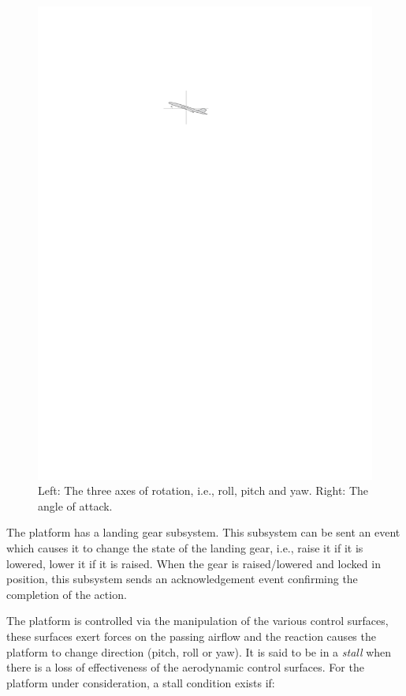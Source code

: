 \begin{figure}
\includegraphics[scale=2]{figs/aoa}
\caption{Left: The three axes of rotation, i.e., roll, pitch and
  yaw. Right: The angle of attack.}
\label{fig:aero}
\end{figure}

The platform has a landing gear subsystem. This subsystem can be sent
an event which causes it to change the state of the landing gear,
i.e., raise it if it is lowered, lower it if it is raised. When the
gear is raised/lowered and locked in position, this subsystem sends an
acknowledgement event confirming the completion of the action.

The platform is controlled via the manipulation of the various control
surfaces, these surfaces exert forces on the passing airflow and the
reaction causes the platform to change direction (pitch, roll or
yaw). It is said to be in a \emph{stall} when there is a loss of
effectiveness of the aerodynamic control surfaces. For the platform
under consideration, a stall condition exists if:

